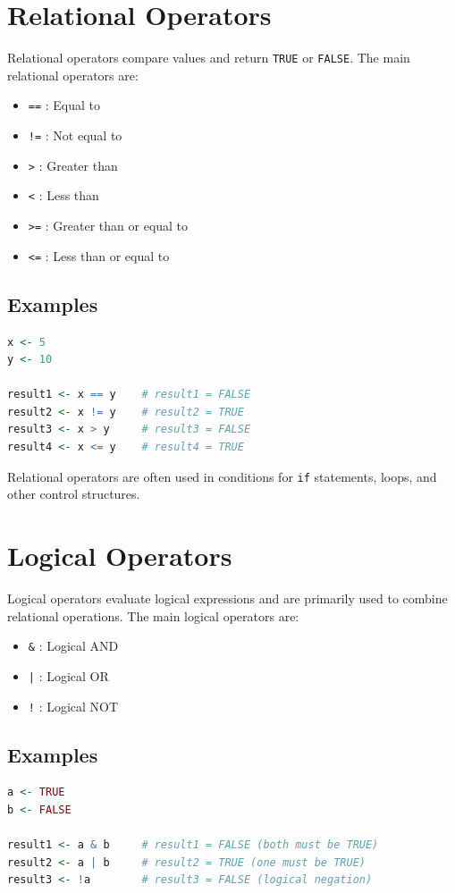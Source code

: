 \documentclass[10pt]{book}
\begin{document}
\section{Relational Operators}
Relational operators compare values and return \texttt{TRUE} or \texttt{FALSE}. The main relational operators are:
\begin{itemize}
    \item \texttt{==} : Equal to
    \item \texttt{!=} : Not equal to
    \item \texttt{>} : Greater than
    \item \texttt{<} : Less than
    \item \texttt{>=} : Greater than or equal to
    \item \texttt{<=} : Less than or equal to
\end{itemize}

\subsection{Examples}
\begin{lstlisting}[language=R]
x <- 5
y <- 10

result1 <- x == y    # result1 = FALSE
result2 <- x != y    # result2 = TRUE
result3 <- x > y     # result3 = FALSE
result4 <- x <= y    # result4 = TRUE
\end{lstlisting}

Relational operators are often used in conditions for \texttt{if} statements, loops, and other control structures.

\section{Logical Operators}
Logical operators evaluate logical expressions and are primarily used to combine relational operations. The main logical operators are:
\begin{itemize}
    \item \texttt{\&} : Logical AND
    \item \texttt{|} : Logical OR
    \item \texttt{!} : Logical NOT
\end{itemize}

\subsection{Examples}
\begin{lstlisting}[language=R]
a <- TRUE
b <- FALSE

result1 <- a & b     # result1 = FALSE (both must be TRUE)
result2 <- a | b     # result2 = TRUE (one must be TRUE)
result3 <- !a        # result3 = FALSE (logical negation)
\end{lstlisting}
\end{document}
